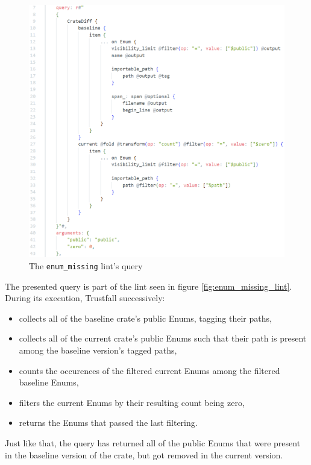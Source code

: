 \documentclass[licencjacka,en]{pracamgr}
\begin{document}
\begin{figure}[h]
	\centering
	\includegraphics[width=0.975\linewidth]{lint-query-example.png}
	\caption{The \texttt{enum\_missing} lint's query}
	\label{fig:enum_missing_lint_query}
\end{figure}

The presented query is part of the lint seen in figure \ref{fig:enum_missing_lint}.
During its execution, Trustfall successively:
\begin{itemize}
	\item collects all of the baseline crate's public Enums, tagging their paths,
	\item collects all of the current crate's public Enums such that their path is present among
		the baseline version's tagged paths,
	\item counts the occurences of the filtered current Enums among the filtered baseline Enums,
	\item filters the current Enums by their resulting count being zero,
	\item returns the Enums that passed the last filtering.
\end{itemize}
Just like that, the query has returned all of the public Enums that were present in the baseline
version of the crate, but got removed in the current version.
\end{document}
